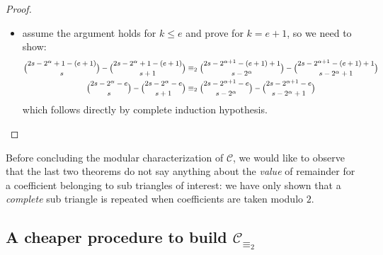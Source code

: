 \begin{proof}
\begin{itemize}
        \item assume the argument holds for $k\leq e$ and prove for $k=e+1$, so we need to show:
            \begin{displaymath}
                \footnotesize
                \begin{split}
                    {{2s-2^{{\alpha}}+1-(e+1)}\choose{s}} - {{2s-2^{{\alpha}}+1-(e+1)}\choose{s+1}}
                    &\equiv_{2}
                    {{2s-2^{{\alpha}+1}-(e+1)+1}\choose{s-2^{{\alpha}}}} - {{2s-2^{{\alpha}+1}-(e+1)+1}\choose{s-2^{{\alpha}}+1}}\\
                    {{2s-2^{{\alpha}}-e}\choose{s}} - {{2s-2^{{\alpha}}-e}\choose{s+1}}
                    &\equiv_{2}
                    {{2s-2^{{\alpha}+1}-e}\choose{s-2^{{\alpha}}}} - {{2s-2^{{\alpha}+1}-e}\choose{s-2^{{\alpha}}+1}}\\
                \end{split}
            \end{displaymath}
            which follows directly by complete induction hypothesis.
    \end{itemize}
\end{proof}



Before concluding the modular characterization of $\mathcal{C}$,
we would like to observe that the last two
theorems do not say anything about the \emph{value} of remainder for
a coefficient belonging to sub triangles of interest:
we have only shown that a \emph{complete} sub triangle is repeated
when coefficients are taken modulo $2$.

\subsection{A cheaper procedure to build $\mathcal{C}_{\equiv_{2}}$}

